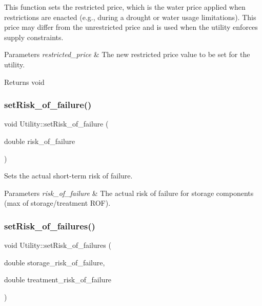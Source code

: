 This function sets the restricted price, which is the water price applied when restrictions are enacted (e.\+g., during a drought or water usage limitations). This price may differ from the unrestricted price and is used when the utility enforces supply constraints.


\begin{DoxyParams}{Parameters}
{\em restricted\+\_\+price} & The new restricted price value to be set for the utility.\\
\hline
\end{DoxyParams}
\begin{DoxyReturn}{Returns}
void 
\end{DoxyReturn}
\mbox{\label{classUtility_a68d5088951f6bdccbb7af18ea8f153f5}} 
\subsubsection{\texorpdfstring{set\+Risk\+\_\+of\+\_\+failure()}{setRisk\_of\_failure()}}
{\footnotesize\ttfamily void Utility\+::set\+Risk\+\_\+of\+\_\+failure (\begin{DoxyParamCaption}\item[{double}]{risk\+\_\+of\+\_\+failure }\end{DoxyParamCaption})}



Sets the actual short-\/term risk of failure. 


\begin{DoxyParams}{Parameters}
{\em risk\+\_\+of\+\_\+failure} & The actual risk of failure for storage components (max of storage/treatment R\+OF). \\
\hline
\end{DoxyParams}
\mbox{\label{classUtility_aadf42161486c8305b0b55aa65c5f519e}} 
\subsubsection{\texorpdfstring{set\+Risk\+\_\+of\+\_\+failures()}{setRisk\_of\_failures()}}
{\footnotesize\ttfamily void Utility\+::set\+Risk\+\_\+of\+\_\+failures (\begin{DoxyParamCaption}\item[{double}]{storage\+\_\+risk\+\_\+of\+\_\+failure,  }\item[{double}]{treatment\+\_\+risk\+\_\+of\+\_\+failure }\end{DoxyParamCaption})}



